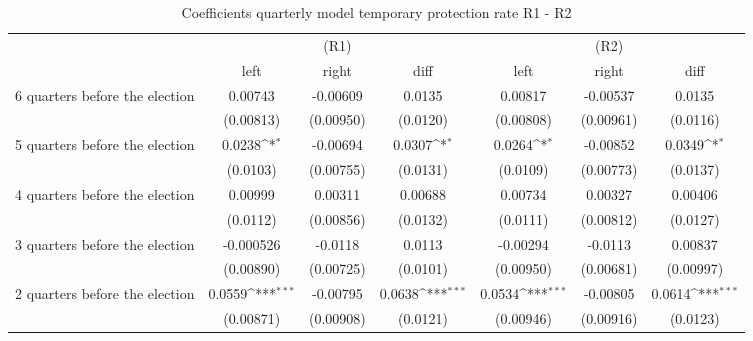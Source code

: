 \begin{table}[!ht]\centering \footnotesize
\def\sym#1{\ifmmode^{#1}\else\(^{#1}\)\fi}
\caption{Coefficients quarterly model temporary protection rate R1 - R2}
\begin{tabular}{l*{6}{c}}
\hline\hline
                    &\multicolumn{3}{c}{(R1)}&\multicolumn{3}{c}{(R2)}\\
&\multicolumn{1}{c}{left}&\multicolumn{1}{c}{right}&\multicolumn{1}{c}{diff}&\multicolumn{1}{c}{left}&\multicolumn{1}{c}{right}&\multicolumn{1}{c}{diff}\\
\hline
 6 quarters before the election&     0.00743         &    -0.00609         &      0.0135         &     0.00817         &    -0.00537         &      0.0135         \\
                    &   (0.00813)         &   (0.00950)         &    (0.0120)         &   (0.00808)         &   (0.00961)         &    (0.0116)         \\
[0,5em]
 5 quarters before the election&      0.0238\sym{*}  &    -0.00694         &      0.0307\sym{*}  &      0.0264\sym{*}  &    -0.00852         &      0.0349\sym{*}  \\
                    &    (0.0103)         &   (0.00755)         &    (0.0131)         &    (0.0109)         &   (0.00773)         &    (0.0137)         \\
[0,5em]
 4 quarters before the election&     0.00999         &     0.00311         &     0.00688         &     0.00734         &     0.00327         &     0.00406         \\
                    &    (0.0112)         &   (0.00856)         &    (0.0132)         &    (0.0111)         &   (0.00812)         &    (0.0127)         \\
[0,5em]
 3 quarters before the election&   -0.000526         &     -0.0118         &      0.0113         &    -0.00294         &     -0.0113         &     0.00837         \\
                    &   (0.00890)         &   (0.00725)         &    (0.0101)         &   (0.00950)         &   (0.00681)         &   (0.00997)         \\
[0,5em]
 2 quarters before the election&      0.0559\sym{***}&    -0.00795         &      0.0638\sym{***}&      0.0534\sym{***}&    -0.00805         &      0.0614\sym{***}\\
                    &   (0.00871)         &   (0.00908)         &    (0.0121)         &   (0.00946)         &   (0.00916)         &    (0.0123)         \\

\end{tabular}
\end{table}
